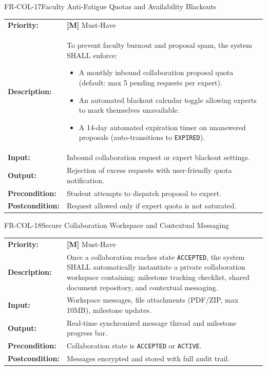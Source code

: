 \documentclass[11pt,a4paper]{article}
\begin{document}
\begin{reqbox}{FR-COL-17}{Faculty Anti-Fatigue Quotas and Availability Blackouts}
\begin{tabularx}{\textwidth}{@{}lX@{}}
\textbf{Priority:} & \textbf{[M]} Must-Have \\
\textbf{Description:} & To prevent faculty burnout and proposal spam, the system SHALL enforce:
\begin{itemize}[noitemsep]
    \item A monthly inbound collaboration proposal quota (default: max 5 pending requests per expert).
    \item An automated blackout calendar toggle allowing experts to mark themselves unavailable.
    \item A 14-day automated expiration timer on unanswered proposals (auto-transitions to \texttt{EXPIRED}).
\end{itemize} \\
\textbf{Input:} & Inbound collaboration request or expert blackout settings. \\
\textbf{Output:} & Rejection of excess requests with user-friendly quota notification. \\
\textbf{Precondition:} & Student attempts to dispatch proposal to expert. \\
\textbf{Postcondition:} & Request allowed only if expert quota is not saturated. \\
\end{tabularx}
\end{reqbox}

\begin{reqbox}{FR-COL-18}{Secure Collaboration Workspace and Contextual Messaging}
\begin{tabularx}{\textwidth}{@{}lX@{}}
\textbf{Priority:} & \textbf{[M]} Must-Have \\
\textbf{Description:} & Once a collaboration reaches state \texttt{ACCEPTED}, the system SHALL automatically instantiate a private collaboration workspace containing: milestone tracking checklist, shared document repository, and contextual messaging. \\
\textbf{Input:} & Workspace messages, file attachments (PDF/ZIP, max 10MB), milestone updates. \\
\textbf{Output:} & Real-time synchronized message thread and milestone progress bar. \\
\textbf{Precondition:} & Collaboration state is \texttt{ACCEPTED} or \texttt{ACTIVE}. \\
\textbf{Postcondition:} & Messages encrypted and stored with full audit trail. \\
\end{tabularx}
\end{reqbox}
\end{document}
